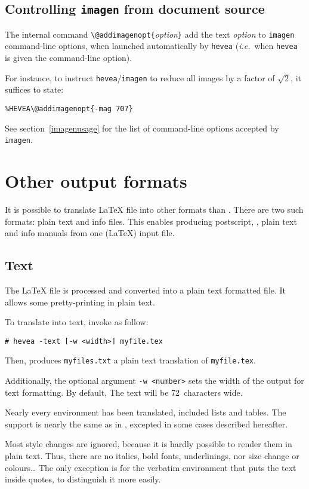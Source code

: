 \subsection{Controlling\label{imagen-source} \texttt{imagen} from document source}
The internal command
\verb+\@addimagenopt{+\textit{option}\verb+}+ add
the text \textit{option} to \texttt{imagen} command-line options, when
launched automatically by \texttt{hevea} (\emph{i.e.}\ when
\texttt{hevea} is given the  command-line option).

For instance, to instruct \texttt{hevea}/\texttt{imagen} to
reduce all images by a factor of $\sqrt{2}$, it suffices to state:
\begin{flushleft}
\texttt{\%HEVEA}\verb+\@addimagenopt{-mag 707}+
\end{flushleft}
See section~\ref{imagenusage} for the list of command-line options
accepted by \texttt{imagen}.

\section{Other \label{alternative}output formats}
It is possible to translate \LaTeX{} file into other formats than
\html. There are two such formats: plain text and info files.
This enables producing postscript,
\html, plain text and info manuals from one (\LaTeX) input file.

\subsection{Text}
The \LaTeX{} file is processed and converted into a plain text
formatted file. It allows some pretty-printing in plain text.

To translate into text, invoke \hevea{} as follow:
\begin{verbatim}
# hevea -text [-w <width>] myfile.tex
\end{verbatim}
Then, \hevea{} produces \texttt{myfiles.txt} a plain text translation
of \texttt{myfile.tex}.

Additionally, the optional argument \texttt{-w <number>} sets the
width of the output for text formatting. By default, The text will be
72~characters wide.

Nearly every environment has been translated, included lists and tables.
The support is nearly the same as in \html, excepted in some cases
described hereafter.

Most style changes are ignored, because it is hardly
possible to render them in plain text. Thus, there are no italics,
bold fonts, underlinings, nor size change or colours\ldots{}
The only exception is for the verbatim environment
that puts the text inside quotes, to distinguish it more easily.

